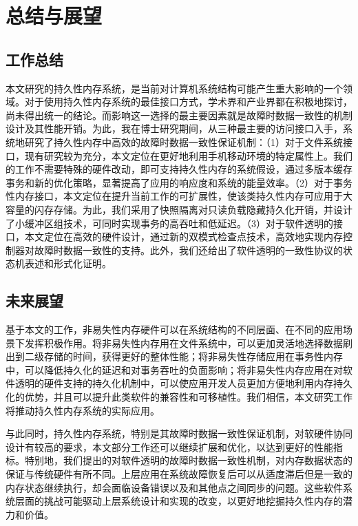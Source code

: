 \chapter{总结与展望}
\label{chap:conclusion}

\section{工作总结}

本文研究的持久性内存系统，是当前对计算机系统结构可能产生重大影响的一个领域。对于使用持久性内存系统的最佳接口方式，学术界和产业界都在积极地探讨，尚未得出统一的结论。而影响这一选择的最主要因素就是故障时数据一致性的机制设计及其性能开销。为此，我在博士研究期间，从三种最主要的访问接口入手，系统地研究了持久性内存中高效的故障时数据一致性保证机制：（1）对于文件系统接口，现有研究较为充分，本文定位在更好地利用手机移动环境的特定属性上。我们的工作不需要特殊的硬件改动，即可支持持久性内存的系统假设，通过多版本缓存事务和新的优化策略，显著提高了应用的响应度和系统的能量效率。（2）对于事务性内存接口，本文定位在提升当前工作的可扩展性，使该类持久性内存可应用于大容量的闪存存储。为此，我们采用了快照隔离对只读负载隐藏持久化开销，并设计了小缓冲区组技术，可同时实现事务的高吞吐和低延迟。（3）对于软件透明的接口，本文定位在高效的硬件设计，通过新的双模式检查点技术，高效地实现内存控制器对故障时数据一致性的支持。此外，我们还给出了软件透明的一致性协议的状态机表述和形式化证明。

\section{未来展望}

基于本文的工作，非易失性内存硬件可以在系统结构的不同层面、在不同的应用场景下发挥积极作用。将非易失性内存用在文件系统中，可以更加灵活地选择数据刷出到二级存储的时间，获得更好的整体性能；将非易失性存储应用在事务性内存中，可以降低持久化的延迟和对事务吞吐的负面影响；将非易失性内存应用在对软件透明的硬件支持的持久化机制中，可以使应用开发人员更加方便地利用内存持久化的优势，并且可以提升此类软件的兼容性和可移植性。我们相信，本文研究工作将推动持久性内存系统的实际应用。

与此同时，持久性内存系统，特别是其故障时数据一致性保证机制，对软硬件协同设计有较高的要求，本文部分工作还可以继续扩展和优化，以达到更好的性能指标。特别地，我们提出的对软件透明的故障时数据一致性机制，对内存数据状态的保证与传统硬件有所不同。上层应用在系统故障恢复后可以从适度滞后但是一致的内存状态继续执行，却会面临设备错误以及和其他点之间同步的问题。这些软件系统层面的挑战可能驱动上层系统设计和实现的改变，以更好地挖掘持久性内存的潜力和价值。
